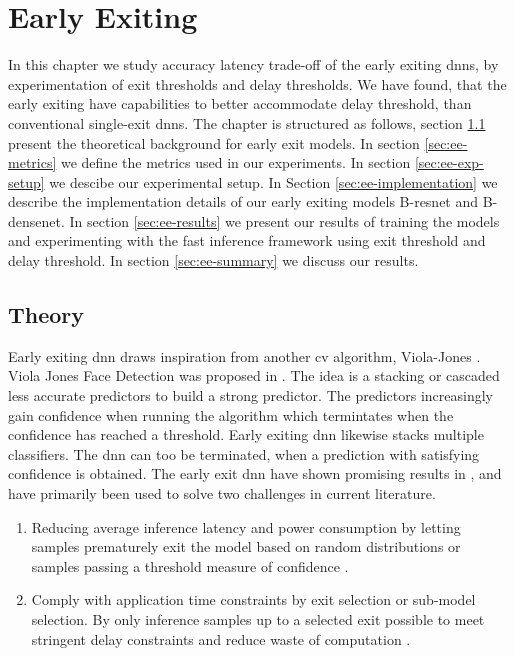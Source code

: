 \hypertarget{earlyexiting}{%
	\chapter{Early Exiting}\label{ch:earlyexit}}
\thispagestyle{fancy}

In this chapter we study accuracy latency trade-off of the early exiting \gls{dnn}s, by experimentation of exit thresholds and delay thresholds. We have found, that the early exiting have capabilities to better accommodate delay threshold, than conventional single-exit \gls{dnn}s. The chapter is structured as follows, section \ref{sec:ee-theory} present the theoretical background for early exit models. In section \ref{sec:ee-metrics} we define the metrics used in our experiments. In section \ref{sec:ee-exp-setup} we descibe our experimental setup. In Section \ref{sec:ee-implementation} we describe the implementation details of our early exiting models B-\gls{resnet} and B-\gls{densenet}. In section \ref{sec:ee-results} we present our results of training the models and experimenting with the fast inference framework using exit threshold and delay threshold. In section \ref{sec:ee-summary} we discuss our results.

\section{Theory} \label{sec:ee-theory}

Early exiting \gls{dnn} draws inspiration from another \gls{cv} algorithm, Viola-Jones \cite{viola_rapid_2001}. Viola Jones Face Detection was proposed in \citeyear{viola_rapid_2001}. The idea is a stacking or cascaded less accurate predictors to build a strong predictor. The predictors increasingly gain confidence when running the algorithm which termintates when the confidence has reached a threshold. Early exiting \gls{dnn} likewise stacks multiple classifiers. The \gls{dnn} can too be terminated, when a prediction with satisfying confidence is obtained. The early exit \gls{dnn} have shown promising results in \cite{leroux_cascading_2017, teerapittayanon_branchynet:_2016, leroux_resource-constrained_2015, teerapittayanon_distributed_2017, huang_multi-scale_2017, li_edge_2018}, and have primarily been used to solve two challenges in current literature.

\begin{enumerate}
	\item Reducing average inference latency and power consumption by letting samples prematurely exit the model based on random distributions \cite{bibid} or samples passing a threshold measure of confidence \cite{teerapittayanon_branchynet:_2016}.
	\item Comply with application time constraints by exit selection or sub-model selection. By only inference samples up to a selected exit possible to meet stringent delay constraints and reduce waste of computation \cite{li_edge_2018}. 
\end{enumerate}

